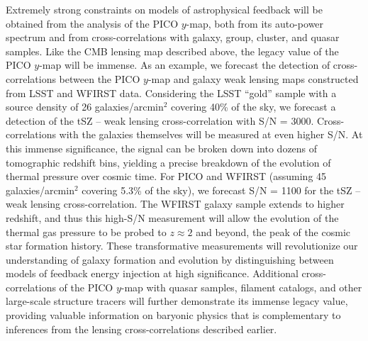 \documentclass[PICOReport.tex]{subfiles}
\begin{document}
Extremely strong constraints on models of astrophysical feedback will be obtained from the analysis of the PICO $y$-map, both from its auto-power spectrum and from cross-correlations with galaxy, group, cluster, and quasar samples.  Like the CMB lensing map described above, the legacy value of the PICO $y$-map will be immense.  As an example, we forecast the detection of cross-correlations between the PICO $y$-map and galaxy weak lensing maps constructed from LSST and WFIRST data.  Considering the LSST ``gold'' sample with a source density of 26 galaxies/arcmin${}^2$ covering 40\% of the sky, we forecast a detection of the tSZ -- weak lensing cross-correlation with S/N = 3000.  Cross-correlations with the galaxies themselves will be measured at even higher S/N.  At this immense significance, the signal can be broken down into dozens of tomographic redshift bins, yielding a precise breakdown of the evolution of thermal pressure over cosmic time.  For PICO and WFIRST (assuming 45 galaxies/arcmin${}^2$ covering 5.3\% of the sky), we forecast S/N = 1100 for the tSZ -- weak lensing cross-correlation.  The WFIRST galaxy sample extends to higher redshift, and thus this high-S/N measurement will allow the evolution of the thermal gas pressure to be probed to $z \approx 2$ and beyond, the peak of the cosmic star formation history.  These transformative measurements will revolutionize our understanding of galaxy formation and evolution by distinguishing between models of feedback energy injection at high significance.  Additional cross-correlations of the PICO $y$-map with quasar samples, filament catalogs, and other large-scale structure tracers will further demonstrate its immense legacy value, providing valuable information on baryonic physics that is complementary to inferences from the lensing cross-correlations described earlier. %
\end{document}

